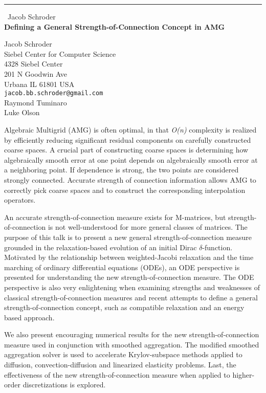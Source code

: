 \documentclass{report}
\begin{document}
\begin{center}
\rule{6in}{1pt} \
{\large Jacob Schroder \\
{\bf Defining a General Strength-of-Connection Concept in AMG}}

Jacob Schroder \\ Siebel Center for Computer Science \\ 4328 Siebel Center \\ 201 N Goodwin Ave \\ Urbana IL 61801 USA
\\
{\tt jacob.bb.schroder@gmail.com}\\
Raymond Tuminaro\\
Luke Olson\end{center}

Algebraic Multigrid (AMG) is often optimal, in that \emph{O(n)}
complexity is realized by efficiently reducing significant residual
components on carefully constructed coarse spaces. A crucial part of
constructing coarse spaces is determining how algebraically smooth error
at one point depends on algebraically smooth error at a neighboring
point. If dependence is strong, the two points are considered strongly
connected. Accurate strength of connection information allows AMG to
correctly pick coarse spaces and to construct the corresponding
interpolation operators.

An accurate strength-of-connection measure exists for M-matrices, but
strength-of-connection is not well-understood for more general classes of
matrices. The purpose of this talk is to present a new general
strength-of-connection measure grounded in the relaxation-based evolution
of an initial Dirac $\delta$-function. Motivated by the relationship
between weighted-Jacobi relaxation and the time marching of ordinary
differential equations (ODEs), an ODE perspective is presented for
understanding the new strength-of-connection measure. The ODE perspective
is also very enlightening when examining strengths and weaknesses of
classical strength-of-connection measures and recent attempts to define a
general strength-of-connection concept, such as compatible relaxation and
an energy based approach.

We also present encouraging numerical results for the new
strength-of-connection measure used in conjunction with smoothed
aggregation. The modified smoothed aggregation solver is used to
accelerate Krylov-subspace methods applied to diffusion,
convection-diffusion and linearized elasticity problems. Last, the
effectiveness of the new strength-of-connection measure when applied to
higher-order discretizations is explored.
\end{document}
